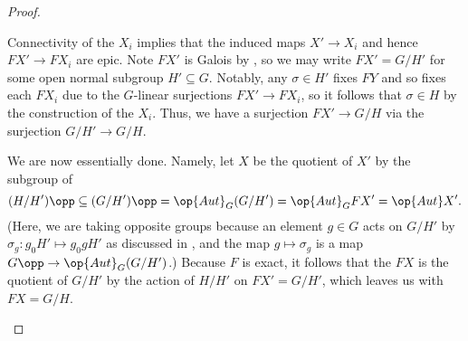 \documentclass{amsart}
\begin{document}
\begin{proof}
\begin{itemize}
        Connectivity of the $X_i$ implies that the induced maps $X'\to X_i$ and hence $FX'\to FX_i$ are epic. Note $FX'$ is Galois by , so we may write $FX'=G/H'$ for some open normal subgroup $H'\subseteq G$. Notably, any $\sigma\in H'$ fixes $FY$ and so fixes each $FX_i$ due to the $G$-linear surjections $FX'\to FX_i$, so it follows that $\sigma\in H$ by the construction of the $X_i$. Thus, we have a surjection $FX'\to G/H$ via the surjection $G/H'\to G/H$.
    
        We are now essentially done. Namely, let $X$ be the quotient of $X'$ by the subgroup of
        \[(H/H')\opp\subseteq(G/H')\opp=\op{Aut}_G(G/H')=\op{Aut}_GFX'=\op{Aut}X'.\]
        (Here, we are taking opposite groups because an element $g\in G$ acts on $G/H'$ by $\sigma_g\colon g_0H'\mapsto g_0gH'$ as discussed in , and the map $g\mapsto\sigma_g$ is a map $G\opp\to\op{Aut}_G(G/H')$.) Because $F$ is exact, it follows that the $FX$ is the quotient of $G/H'$ by the action of $H/H'$ on $FX'=G/H'$, which leaves us with $FX=G/H$.
        \qedhere
    \end{itemize}
\end{proof}

\printbibliography[title={References}]
\end{document}
